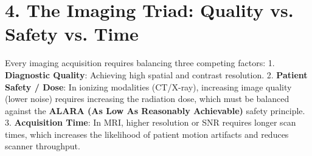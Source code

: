 \section*{4. The Imaging Triad: Quality vs. Safety vs. Time}
Every imaging acquisition requires balancing three competing factors:
1. \textbf{Diagnostic Quality}: Achieving high spatial and contrast resolution.
2. \textbf{Patient Safety / Dose}: In ionizing modalities (CT/X-ray), increasing image quality (lower noise) requires increasing the radiation dose, which must be balanced against the \textbf{ALARA (As Low As Reasonably Achievable)} safety principle.
3. \textbf{Acquisition Time}: In MRI, higher resolution or SNR requires longer scan times, which increases the likelihood of patient motion artifacts and reduces scanner throughput.

\clearpage
